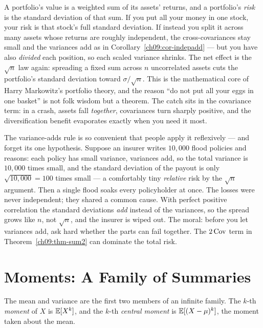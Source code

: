 \begin{applicationbox}
A portfolio's value is a weighted sum of its assets' returns, and a
portfolio's \emph{risk} is the standard deviation of that sum. If you put all
your money in one stock, your risk is that stock's full standard deviation. If
instead you split it across many assets whose returns are roughly
independent, the cross-covariances stay small and the variances add as in
Corollary~\ref{ch09:cor-indepadd} --- but you have also \emph{divided} each
position, so each scaled variance shrinks. The net effect is the $\sqrt n$
law again: spreading a fixed sum across $n$ uncorrelated assets cuts the
portfolio's standard deviation toward $\sigma/\sqrt n$. This is the
mathematical core of Harry Markowitz's portfolio theory, and the reason ``do
not put all your eggs in one basket'' is not folk wisdom but a theorem. The
catch sits in the covariance term: in a crash, assets fall \emph{together},
covariances turn sharply positive, and the diversification benefit
evaporates exactly when you need it most.
\end{applicationbox}

\begin{paradoxbox}
The variance-adds rule is so convenient that people apply it reflexively ---
and forget its one hypothesis. Suppose an insurer writes $10{,}000$ flood
policies and reasons: each policy has small variance, variances add, so the
total variance is $10{,}000$ times small, and the standard deviation of the
payout is only $\sqrt{10{,}000} = 100$ times small --- a comfortably tiny
\emph{relative} risk by the $\sqrt n$ argument. Then a single flood soaks
every policyholder at once. The losses were never independent; they shared a
common cause. With perfect positive correlation the standard deviations
\emph{add} instead of the variances, so the spread grows like $n$, not
$\sqrt n$, and the insurer is wiped out. The moral: before you let variances
add, ask hard whether the parts can fail together. The $2\operatorname{Cov}$ term in
Theorem~\ref{ch09:thm-sum2} can dominate the total risk.
\end{paradoxbox}

\section{Moments: A Family of Summaries}
\label{ch09:moments}

The mean and variance are the first two members of an infinite family. The
$k$-th \emph{moment} of $X$ is $\operatorname{\mathbb{E}}[X^k]$, and the $k$-th \emph{central
moment} is $\operatorname{\mathbb{E}}[(X-\mu)^k]$, the moment taken about the mean.

